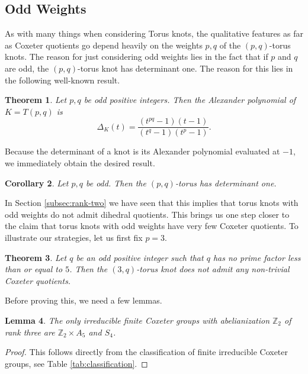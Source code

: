 \documentclass{article}
\newtheorem{theorem}{Theorem}[section]
\newtheorem{corollary}[theorem]{Corollary}
\newtheorem{lemma}[theorem]{Lemma}
\theoremstyle{definition}
\begin{document}
\subsection{Odd Weights}\label{subsec:odd-weights}
As with many things when considering Torus knots, the qualitative features as far as Coxeter quotients go depend heavily on the weights $p, q$ of the $(p, q)$-torus knots. The reason for just considering odd weights lies in the fact that if $p$ and $q$ are odd, the $(p, q)$-torus knot has determinant one. The reason for this lies in the following well-known result.

\begin{theorem}
Let $p, q$ be odd positive integers. Then the Alexander polynomial of $K = T(p, q)$ is
$$\Delta_K(t) = \frac{(t^{pq}-1)(t-1)}{(t^q-1)(t^p-1)}.$$
\end{theorem}

Because the determinant of a knot is its Alexander polynomial evaluated at $-1$, we immediately obtain the desired result.

\begin{corollary}
Let $p, q$ be odd. Then the $(p, q)$-torus has determinant one.
\end{corollary}

In Section \ref{subsec:rank-two} we have seen that this implies that torus knots with odd weights do not admit dihedral quotients. This brings us one step closer to the claim that torus knots with odd weights have very few Coxeter quotients. To illustrate our strategies, let us first fix $p = 3$.

\begin{theorem}\label{thm:p=3}
Let $q$ be an odd positive integer such that $q$ has no prime factor less than or equal to $5$. Then the $(3, q)$-torus knot does not admit any non-trivial Coxeter quotients.
\end{theorem}

Before proving this, we need a few lemmas.

\begin{lemma}
The only irreducible finite Coxeter groups with abelianization $\mathbb{Z}_2$ of rank three are $\mathbb{Z}_2 \times A_5$ and $S_4$.
\end{lemma}

\begin{proof}
This follows directly from the classification of finite irreducible Coxeter groups, see Table \ref{tab:classification}.
\end{proof}
\end{document}
